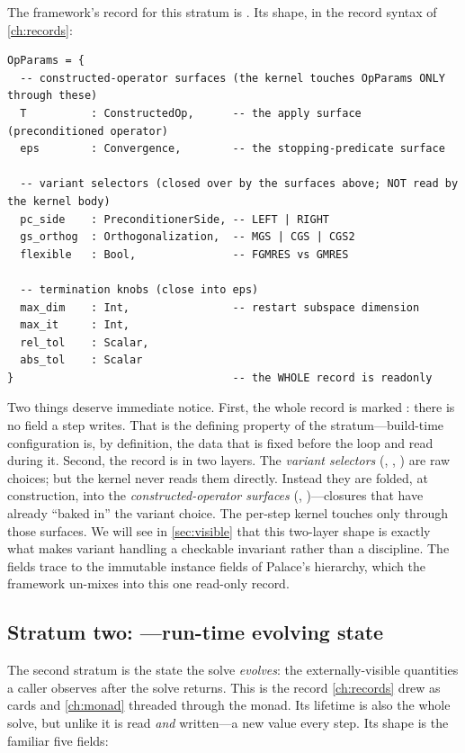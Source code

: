 The framework's record for this stratum is . Its shape, in the
record syntax of \cref{ch:records}:

\begin{lstlisting}[style=l4style]
OpParams = {
  -- constructed-operator surfaces (the kernel touches OpParams ONLY through these)
  T          : ConstructedOp,      -- the apply surface (preconditioned operator)
  eps        : Convergence,        -- the stopping-predicate surface

  -- variant selectors (closed over by the surfaces above; NOT read by the kernel body)
  pc_side    : PreconditionerSide, -- LEFT | RIGHT
  gs_orthog  : Orthogonalization,  -- MGS | CGS | CGS2
  flexible   : Bool,               -- FGMRES vs GMRES

  -- termination knobs (close into eps)
  max_dim    : Int,                -- restart subspace dimension
  max_it     : Int,
  rel_tol    : Scalar,
  abs_tol    : Scalar
}                                  -- the WHOLE record is readonly
\end{lstlisting}

Two things deserve immediate notice. First, the whole record is marked
: there is no field a step writes. That is the defining property
of the stratum---build-time configuration is, by definition, the data that is
fixed before the loop and read during it. Second, the record is in two layers.
The \emph{variant selectors} (, ,
) are raw choices; but the kernel never reads them directly.
Instead they are folded, at construction, into the \emph{constructed-operator
surfaces} (, )---closures that have already ``baked in'' the
variant choice. The per-step kernel touches  only through those
surfaces. We will see in \cref{sec:visible} that this two-layer shape is exactly
what makes variant handling a checkable invariant rather than a discipline. The
fields trace to the immutable instance fields of Palace's 
hierarchy, which the framework un-mixes into this one read-only record.

\subsection{Stratum two: \texorpdfstring{}{SimState}---run-time evolving state}

The second stratum is the state the solve \emph{evolves}: the externally-visible
quantities a caller observes after the solve returns. This is the record
\cref{ch:records} drew as cards and \cref{ch:monad} threaded through the
 monad. Its lifetime is also the whole solve, but unlike
 it is read \emph{and} written---a new value every step. Its
shape is the familiar five fields:

